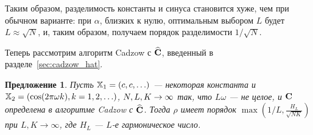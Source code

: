 \documentclass[12pt,a4paper,fleqn,leqno]{article}
\newtheorem{proposition}{Предложение}%
\begin{document}

Таким образом, разделимость константы и синуса становится хуже, чем при обычном варианте: при $\alpha$, близких к нулю, оптимальным выбором $L$ будет $L \approx \sqrt{N}$, и, таким образом, получаем порядок разделимости $1/\sqrt{N}$.

Теперь рассмотрим алгоритм Cadzow с $\widehat{\mathbf{C}}$, введенный в разделе~\ref{sec:cadzow_hat}.

\begin{proposition}
Пусть $\mathbb{X}_1 = (c, c, \ldots)$ --- некоторая константа и $\mathbb{X}_2 = (\cos(2 \pi \omega k), k = 1, 2, \ldots)$, $N,L,K\rightarrow \infty$ так, что $L\omega$ --- не целое, и $\mathbf{C}$ определена в алгоритме Cadzow с $\widehat{\mathbf{C}}$.
 Тогда $\rho$ имеет порядок $\max \left(1/L, \frac{H_L}{\sqrt{NK}} \right)$ при $L, K \to \infty$, где $H_L$ --- $L$-е гармоническое число.
\end{proposition}
\end{document}
